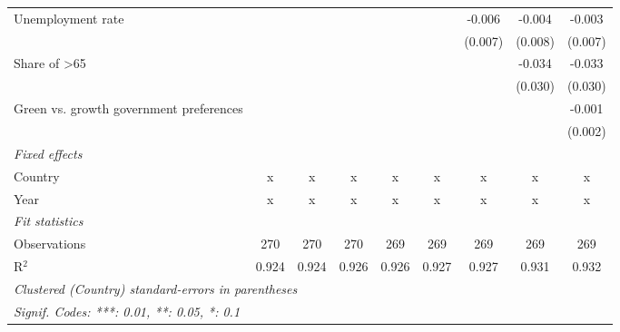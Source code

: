 \begin{table}[htbp]
\begin{tabular}{lcccccccc}
      Unemployment rate                                       &         &         &         &         &         & -0.006  & -0.004  & -0.003\\   
                                                              &         &         &         &         &         & (0.007) & (0.008) & (0.007)\\   
      Share of >65                                            &         &         &         &         &         &         & -0.034  & -0.033\\   
                                                              &         &         &         &         &         &         & (0.030) & (0.030)\\   
      Green vs. growth government preferences                 &         &         &         &         &         &         &         & -0.001\\   
                                                              &         &         &         &         &         &         &         & (0.002)\\   
      \emph{Fixed effects}\\
      Country                                                 & x       & x       & x       & x       & x       & x       & x       & x\\  
      Year                                                    & x       & x       & x       & x       & x       & x       & x       & x\\  
      \midrule \emph{Fit statistics}\\
      Observations                                            & 270     & 270     & 270     & 269     & 269     & 269     & 269     & 269\\  
      R$^2$                                                   & 0.924   & 0.924   & 0.926   & 0.926   & 0.927   & 0.927   & 0.931   & 0.932\\  
      \midrule
      \multicolumn{9}{l}{\emph{Clustered (Country) standard-errors in parentheses}}\\
      \multicolumn{9}{l}{\emph{Signif. Codes: ***: 0.01, **: 0.05, *: 0.1}}\\
   \end{tabular}
\end{table}


